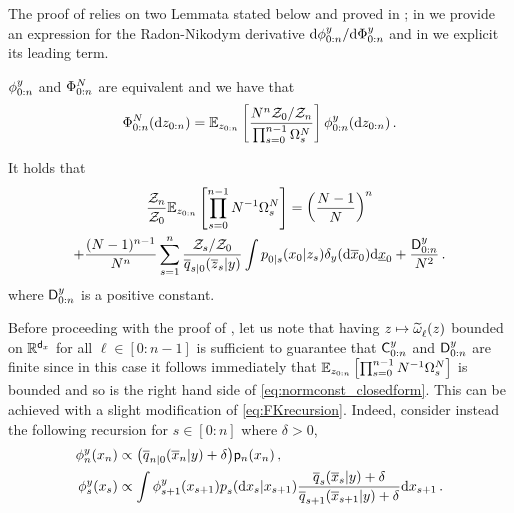 The proof of  relies on two Lemmata stated below and proved in ; in  we provide an expression for the Radon-Nikodym derivative $\rmd \filter{0:n}{y}{} / \rmd \bfilter{0:n}{y}{}$ and in  we explicit its leading term.
\begin{lemma} $\filter{0:n}{y}{}$ and $\bfilter{0:n}{N}{}$ are equivalent and we have that
    \label{lem:rnikod}
    \begin{equation} 
        \bfilter{0:n}{N}{\rmd z_{0:n}} = \pE _{z_{0:n}} \left[ \frac{N^{n} \normconst_0 / \normconst_n}{\prod_{s = 0}^{n-1} \sumweight{s}} \right] \filter{0:n}{y}{\rmd z_{0:n}} \eqsp.
    \end{equation}
\end{lemma}
\begin{lemma} 
    \label{lem:closed_form_bound}
    It holds that
    \begin{multline} 
    \label{eq:normconst_closedform}
        \frac{\normconst_n}{\normconst_0} \pE_{z_{0:n}} \left[ \prod_{s = 0} ^{n-1} N^{-1} \sumweight{s} \right] 
        = \left( \frac{N-1}{N} \right)^{n}  \\
        + \frac{(N-1)^{n-1}}{N^n} \sum_{s = 1} ^n \frac{\normconst_s / \normconst_0}{\tfwtrans{s|0}{\lmeas}{\overline{z}_s} } \int \bwtrans{}{0|s}{z_s}{x_0} \delta_{\lmeas}(\rmd \ltopstate_0) \rmd \lbottomstate_0 + \frac{\mathsf{D}^\lmeas _{0:n}}{N^2} \eqsp.
    \end{multline}
    where $\mathsf{D}^y _{0:n}$ is a positive constant. 
\end{lemma}
Before proceeding with the proof of , let us note that having $z \mapsto \widetilde{\omega}^{} _{\ell}(z)$ bounded on $\mathbb{R}^{{\mathsf{d}_x}}$ for all $\ell \in [0:n-1]$ is sufficient to guarantee that $\mathsf{C}^y _{0:n}$ and $\mathsf{D}^y _{0:n}$ are finite since in this case it follows immediately that $\mathbb{E}_{z_{0:n}} \left[ \prod_{s = 0} ^{n-1} N^{-1} \Omega^N _{s} \right]$ is bounded and so is the right hand side of \eqref{eq:normconst_closedform}. This can be achieved with a slight modification of \eqref{eq:FKrecursion}. Indeed, consider instead the following recursion for $s \in [0:n]$ where $\delta > 0$, 
\begin{align*} 
    \filter{n}{\lmeas}{\lstate_n} & \propto \big( \tfwtrans{n|0}{\lmeas}{\ltopstate_n} + \delta \big)  \bwmarg{n}{\lstate_n} \eqsp, \\
    \filter{s}{\lmeas}{\lstate_s} & \propto \int \filter{s+1}{\lmeas}{\lstate_{s+1}} \bwtrans{}{s}{\lstate_{s+1}}{\rmd \lstate_s} \frac{\tfwtrans{s}{\lmeas}{\ltopstate_s} + \delta}{\tfwtrans{s+1}{\lmeas}{\ltopstate_{s+1}} + \delta} \rmd \lstate_{s+1} \eqsp.
    \end{align*}
